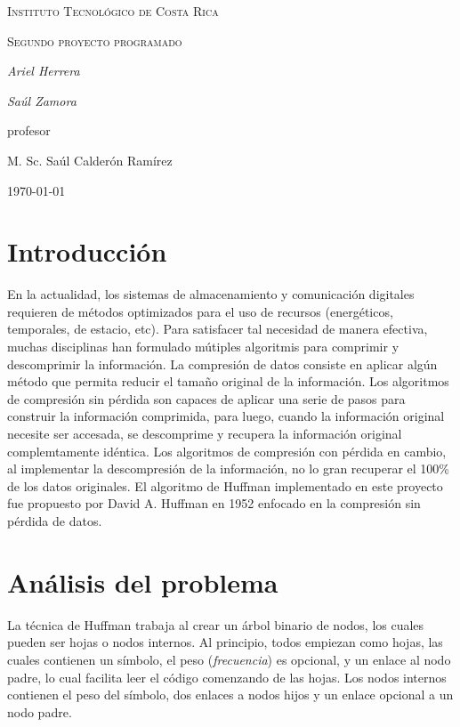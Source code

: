 \documentclass{IEEEtran}
\begin{document}
\begin{titlepage}
  \centering
  {\scshape\LARGE Instituto Tecnol\'ogico de Costa Rica \par}
  \vspace{1cm}
  {\scshape\Large Segundo proyecto programado\par}
  \vspace{1.5cm}
  {\Large\itshape Ariel Herrera\par}
  {\Large\itshape Sa\'ul Zamora\par}
  \vfill
  profesor\par
  M. Sc. Sa\'ul Calder\'on Ram\'irez \textsc{}

  \vfill

  {\large \today\par}
\end{titlepage}

\section{Introducci\'on}
En la actualidad, los sistemas de almacenamiento y comunicaci\'on digitales requieren de m\'etodos optimizados para el uso de recursos (energ\'eticos, temporales, de estacio, etc). Para satisfacer tal necesidad de manera efectiva, muchas disciplinas han formulado m\'utiples algoritmis para comprimir y descomprimir la informaci\'on. La compresi\'on de datos consiste en aplicar alg\'un m\'etodo que permita reducir el tama\~no original de la informaci\'on. Los algoritmos de compresi\'on sin p\'erdida son capaces de aplicar una serie de pasos para construir la informaci\'on comprimida, para luego, cuando la informaci\'on original necesite ser accesada, se descomprime y recupera la informaci\'on original complemtamente id\'entica. Los algoritmos de compresi\'on con p\'erdida en cambio, al implementar la descompresi\'on de la informaci\'on, no lo gran recuperar el 100\% de los datos originales. El algoritmo de Huffman implementado en este proyecto fue propuesto por David A. Huffman en 1952 enfocado en la compresi\'on sin p\'erdida de datos.

\section{An\'alisis del problema}
La t\'ecnica de Huffman trabaja al crear un \'arbol binario de nodos, los cuales pueden ser hojas o nodos internos. Al principio, todos empiezan como hojas, las cuales contienen un s\'imbolo, el peso (\emph{frecuencia}) es opcional, y un enlace al nodo padre, lo cual facilita leer el c\'odigo comenzando de las hojas. Los nodos internos contienen el peso del s\'imbolo, dos enlaces a nodos hijos y un enlace opcional a un nodo padre.
\end{document}
